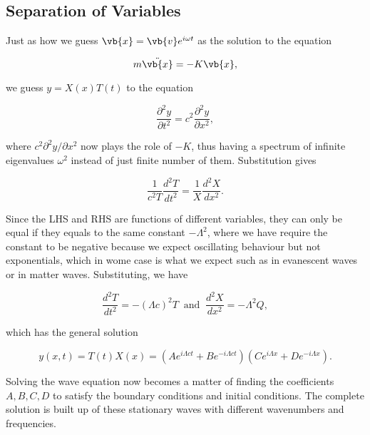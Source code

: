\documentclass[a4paper,12pt]{report}
\begin{document}
\subsection{Separation of Variables} \label{sepvar} 

Just as how we guess \(\vb{x} = \vb{v} e^{i \omega t} \) as the solution to the equation

\begin{equation}
	m\ddot{\vb{x} } = -K\vb{x} ,  
\end{equation}

we guess \(y = X(x)T(t)\) to the equation 

\begin{equation}
	\frac{\partial^2 y}{\partial t^2} = c^2 \frac{\partial^2 y}{\partial x^2}, 
\end{equation}

where \(c^2 \partial ^2 y/\partial x^2 \) now plays the role of \(-K\), thus having a spectrum of infinite eigenvalues \(\omega ^2\) instead of just finite number of them. Substitution gives

\begin{equation}
	\frac{1}{c^2 T} \frac{d^2T}{dt^2} = \frac{1}{X}\frac{d^2X}{dx^2}.
\end{equation}

Since the LHS and RHS are functions of different variables, they can only be equal if they equals to the same constant \(-\Lambda^2 \), where we have require the constant to be negative because we expect oscillating behaviour but not exponentials, which in wome case is what we expect such as in evanescent waves or in matter waves. Substituting, we have

\begin{equation}
	\frac{d^2T }{dt^2} = -(\Lambda c)^2T ~\text { and }~ \frac{d^2X}{dx^2} = -\Lambda ^2Q,
\end{equation}

which has the general solution

\begin{equation}
	y(x,t) = T(t)X(x) = \left( Ae^{i\Lambda ct}+Be^{-i\Lambda ct}    \right)\left( Ce^{i \Lambda x}+De^{-i \Lambda x}   \right). \label{ThetaQ}   
\end{equation}

Solving the wave equation now becomes a matter of finding the coefficients \(A, B, C, D\) to satisfy the boundary conditions and initial conditions. The complete solution is built up of these stationary waves with different wavenumbers and frequencies.
\end{document}
